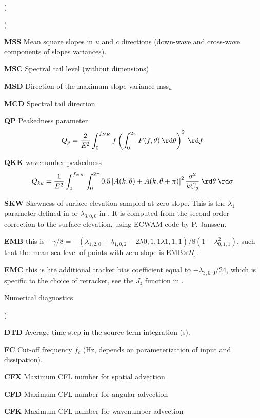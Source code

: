 \begin{list}{)\hfill}
\begin{list}{)\hfill}
\item \textbf{MSS} Mean square slopes in $u$ and $c$ directions (down-wave and cross-wave components of slopes variances). 
\item \textbf{MSC} Spectral tail level (without dimensions) 
\item \textbf{MSD} Direction of the maximum slope variance mss$_u$
\item \textbf{MCD} Spectral tail direction
\item \textbf{QP}  Peakedness parameter \citep{art:G70}
      \begin{equation} Q_p = \frac{2}{E^2} \int_0^{f_{NK}} f \left( \int_0^{2\pi}
      F(f,\theta) \:\rd \theta \right)^2 \: \rd  f \: \label{eq:qp}
      \end{equation}
\item \textbf{QKK}  wavenumber peakedness \citep{art:DC23}
      \begin{equation} Q_{kk} = \frac{1}{E^2} \int_0^{f_{NK}} \int_0^{2\pi}
      0.5 \left[ A(k,\theta)+ A(k,\theta+\pi)\right]^2 \frac{\sigma^2}{k C_g} \:\rd \theta  \: \rd  \sigma \: \label{eq:qkk}
      \end{equation}
\item \textbf{SKW}  Skewness of surface elevation sampled at zero slope. This is the $\lambda_1$ parameter defined in \cite{Barrick&Lipa1985} or $\lambda_{3,0,0}$ in \cite{Srokosz1986}. It is computed from the second order correction to the surface elevation, using ECWAM code by P. Janssen.
\item \textbf{EMB} this is  $-\gamma/8 = -(\lambda_{1,2,0}+\lambda_{1,0,2}-2 \lambda{0,1,1} \lambda{1,1,1})/8 (1-\lambda_{0,1,1}^2)$, such that the mean sea level of points with zero slope
is EMB$\times H_s$.
\item \textbf{EMC} this is hte additional tracker bias coefficient equal to  $-\lambda_{3,0,0}/24$, which is specific to the choice of retracker, see the $J_z$ function in \cite{DeCarlo&Ardhuin2024}.
\end{list}

\item{Numerical diagnostics }

\begin{list}{)\hfill}
            { \leftmargin 8mm 
             \rightmargin 0mm \itemsep 0mm \parsep 0mm}
\item \textbf{DTD} Average time step in the source term integration (s).
\item \textbf{FC} Cut-off frequency $f_c$ (Hz, depends on parameterization of
      input and dissipation).
\item \textbf{CFX} Maximum CFL number for spatial advection 
\item \textbf{CFD} Maximum CFL number for angular advection 
\item \textbf{CFK} Maximum CFL number for wavenumber advection 
\end{list}


\end{list}
